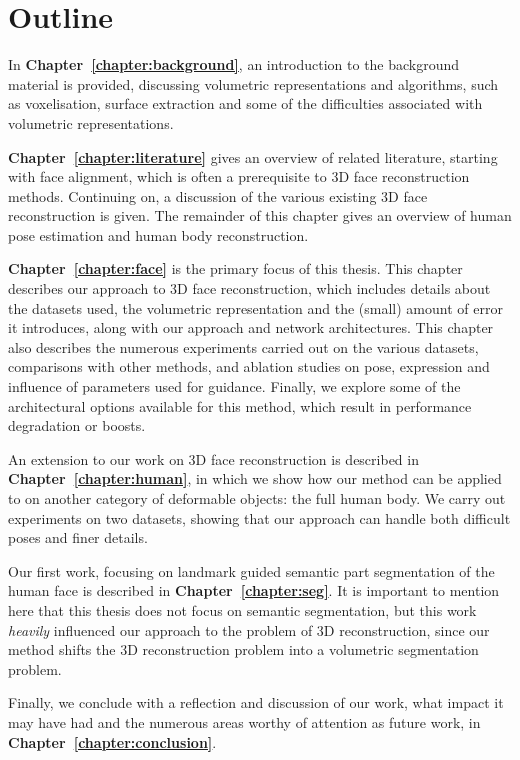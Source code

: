 \section{Outline}

In \textbf{Chapter~\ref{chapter:background}}, an introduction to the
background material is provided, discussing volumetric representations
and algorithms, such as voxelisation, surface extraction and some of
the difficulties associated with volumetric representations.

\textbf{Chapter~\ref{chapter:literature}} gives an overview of related
literature, starting with face alignment, which is often a
prerequisite to 3D face reconstruction methods. Continuing on, a
discussion of the various existing 3D face reconstruction is
given. The remainder of this chapter gives an overview of human pose
estimation and human body reconstruction.

\textbf{Chapter~\ref{chapter:face}} is the primary focus of this
thesis. This chapter describes our approach to 3D face reconstruction,
which includes details about the datasets used, the volumetric
representation and the (small) amount of error it introduces, along
with our approach and network architectures. This chapter also
describes the numerous experiments carried out on the various
datasets, comparisons with other methods, and ablation studies on
pose, expression and influence of parameters used for
guidance. Finally, we explore some of the architectural options
available for this method, which result in performance degradation or
boosts.

An extension to our work on 3D face reconstruction is described in
\textbf{Chapter~\ref{chapter:human}}, in which we show how our method
can be applied to on another category of deformable objects: the full
human body. We carry out experiments on two datasets, showing that our
approach can handle both difficult poses and finer details.

Our first work, focusing on landmark guided semantic part segmentation
of the human face is described in
\textbf{Chapter~\ref{chapter:seg}}. It is important to mention here
that this thesis does not focus on semantic segmentation, but this
work \textit{heavily} influenced our approach to the problem of 3D
reconstruction, since our method shifts the 3D reconstruction problem
into a volumetric segmentation problem.

Finally, we conclude with a reflection and discussion of our work,
what impact it may have had and the numerous areas worthy of attention
as future work, in \textbf{Chapter~\ref{chapter:conclusion}}.

